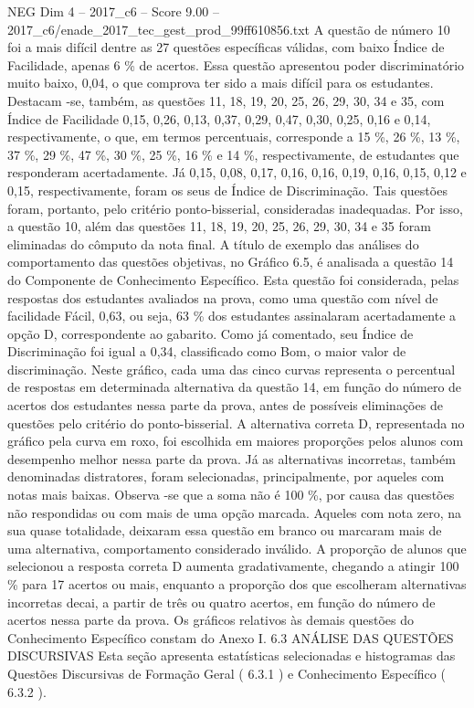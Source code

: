 \begin{textsample}{NEG Dim 4 – 2017\_c6 – Score 9.00 – 2017\_c6/enade\_2017\_tec\_gest\_prod\_99ff610856.txt}
A questão de número 10 foi a mais difícil dentre as 27 questões específicas válidas, com baixo Índice de Facilidade, apenas 6 \% de acertos.
Essa questão apresentou poder discriminatório muito baixo, 0,04, o que comprova ter sido a mais difícil para os estudantes.
Destacam -se, também, as questões 11, 18, 19, 20, 25, 26, 29, 30, 34 e 35, com Índice de Facilidade 0,15, 0,26, 0,13, 0,37, 0,29, 0,47, 0,30, 0,25, 0,16 e 0,14, respectivamente, o que, em termos percentuais, corresponde a 15 \%, 26 \%, 13 \%, 37 \%, 29 \%, 47 \%, 30 \%, 25 \%, 16 \% e 14 \%, respectivamente, de estudantes que responderam acertadamente.
Já 0,15, 0,08, 0,17, 0,16, 0,16, 0,19, 0,16, 0,15, 0,12 e 0,15, respectivamente, foram os seus de Índice de Discriminação.
Tais questões foram, portanto, pelo critério ponto-bisserial, consideradas inadequadas.
Por isso, a questão 10, além das questões 11, 18, 19, 20, 25, 26, 29, 30, 34 e 35 foram eliminadas do cômputo da nota final.
A título de exemplo das análises do comportamento das questões objetivas, no Gráfico 6.5, é analisada a questão 14 do Componente de Conhecimento Específico.
Esta questão foi considerada, pelas respostas dos estudantes avaliados na prova, como uma questão com nível de facilidade Fácil, 0,63, ou seja, 63 \% dos estudantes assinalaram acertadamente a opção D, correspondente ao gabarito.
Como já comentado, seu Índice de Discriminação foi igual a 0,34, classificado como Bom, o maior valor de discriminação.
Neste gráfico, cada uma das cinco curvas representa o percentual de respostas em determinada alternativa da questão 14, em função do número de acertos dos estudantes nessa parte da prova, antes de possíveis eliminações de questões pelo critério do ponto-bisserial.
A alternativa correta D, representada no gráfico pela curva em roxo, foi escolhida em maiores proporções pelos alunos com desempenho melhor nessa parte da prova.
Já as alternativas incorretas, também denominadas distratores, foram selecionadas, principalmente, por aqueles com notas mais baixas.
Observa -se que a soma não é 100 \%, por causa das questões não respondidas ou com mais de uma opção marcada.
Aqueles com nota zero, na sua quase totalidade, deixaram essa questão em branco ou marcaram mais de uma alternativa, comportamento considerado inválido.
A proporção de alunos que selecionou a resposta correta D aumenta gradativamente, chegando a atingir 100 \% para 17 acertos ou mais, enquanto a proporção dos que escolheram alternativas incorretas decai, a partir de três ou quatro acertos, em função do número de acertos nessa parte da prova.
Os gráficos relativos às demais questões do Conhecimento Específico constam do Anexo I. 6.3 ANÁLISE DAS QUESTÕES DISCURSIVAS Esta seção apresenta estatísticas selecionadas e histogramas das Questões Discursivas de Formação Geral ( 6.3.1 ) e Conhecimento Específico ( 6.3.2 ).

\end{textsample}
